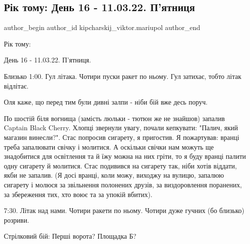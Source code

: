  
 
 
 
 

\subsection{Рік тому: День 16 - 11.03.22. П'ятниця}
\label{sec:11_03_2023.fb.kipcharskij_viktor.mariupol.1.r_k_tomu__den_16___1}

\ifcmt
 author_begin
   author_id kipcharskij_viktor.mariupol
 author_end
\fi

Рік тому:

День 16 - 11.03.22. П'ятниця. 

Близько 1:00. Гул літака. Чотири пуски ракет по ньому. Гул затихає, тобто літак
відлітає.

Оля каже, що перед тим були дивні залпи - ніби бій вже десь поруч.


По шостій біля вогнища (замість люльки -  тютюн же не знайшов)  запалив Captain
Black Cherry. Хлопці звернули увагу, почали кепкувати: "Палич, який магазин
винесли?". Стас попросив сигарету, я пригостив. Я пожартував: вранці треба
запалювати свічку і молитися. А оскільки свічки нам можуть ще знадобитися для
освітлення та й їжу можна на них гріти, то я буду вранці палити одну сигарету й
молитися. Стас подивився на сигарету так, ніби хотів віддати, якби не запалив.
(Я досі вранці, коли можу, виходжу на вулицю, запалюю сигарету і молюся за
звільнення полонених друзів, за виздоровлення поранених, за збереження тих, хто
воює та за упокій вбитих). 

7:30. Літак над нами. Чотири ракети по ньому. Чотири дуже гучних (бо близько)
розриви.

Стрілковий бій: Перші ворота? Площадка Б?

